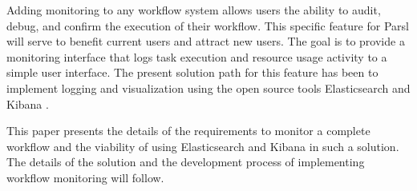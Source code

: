 Adding monitoring to any workflow system allows users the ability to audit, debug, and confirm the execution of their workflow.
This specific feature for Parsl will serve to benefit current users and attract new users.
The goal is to provide a monitoring interface that logs task execution and resource usage activity to a simple user interface.
The present solution path for this feature has been to implement logging and visualization using the open source tools Elasticsearch and Kibana \cite{ElasticsearchKibana}.

This paper presents the details of the requirements to monitor a complete workflow and the viability of using Elasticsearch and Kibana in such a solution.
The details of the solution and the development process of implementing workflow monitoring will follow.
